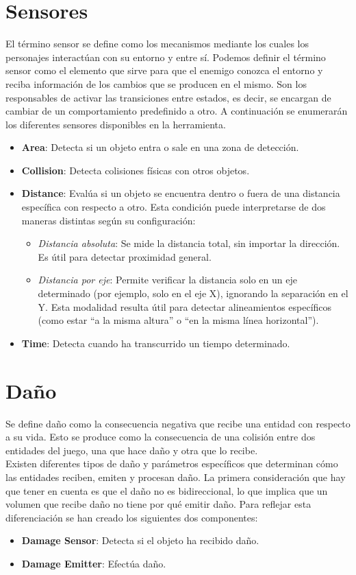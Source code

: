 \section{Sensores}
\label{subsec:sensores}
El término sensor se define como los mecanismos mediante los cuales los personajes interactúan con su entorno y entre sí.
Podemos definir el término sensor como el elemento que sirve para que el enemigo conozca el entorno y reciba información de los cambios que se producen en el mismo. Son los responsables de activar las transiciones entre estados, es decir, se encargan de cambiar de un comportamiento predefinido a otro.
A continuación se enumerarán los diferentes sensores disponibles en la herramienta.
\begin{itemize}
	\item \textbf{Area}: Detecta si un objeto entra o sale en una zona de detección.
	\item \textbf{Collision}: Detecta colisiones físicas con otros objetos.
	\item \textbf{Distance}: Evalúa si un objeto se encuentra dentro o fuera de una distancia específica con respecto a otro. Esta condición puede interpretarse de dos maneras distintas según su configuración:
	\begin{itemize}
	    \item \textit{Distancia absoluta}: Se mide la distancia total, sin importar la dirección. Es útil para detectar proximidad general.
	    \item \textit{Distancia por eje}: Permite verificar la distancia solo en un eje determinado (por ejemplo, solo en el eje X), ignorando la separación en el Y. Esta modalidad resulta útil para detectar alineamientos específicos (como estar “a la misma altura” o “en la misma línea horizontal”).
	\end{itemize}
	\item \textbf{Time}: Detecta cuando ha transcurrido un tiempo determinado.
\end{itemize}
\section{Daño}
Se define daño como la consecuencia negativa que recibe una entidad con respecto a su vida. Esto se produce como la consecuencia de una colisión entre dos entidades del juego, una que hace daño y otra que lo recibe.\\
Existen diferentes tipos de daño y parámetros específicos que determinan cómo las entidades reciben, emiten y procesan daño.
La primera consideración que hay que tener en cuenta es que el daño no es bidireccional, lo que implica que un volumen que recibe daño no tiene por qué emitir daño. Para reflejar esta diferenciación se han creado los siguientes dos componentes:
\begin{itemize}
    \item \textbf{Damage Sensor}: Detecta si el objeto ha recibido daño.
    \item \textbf{Damage Emitter}: Efectúa daño.
\end{itemize}


